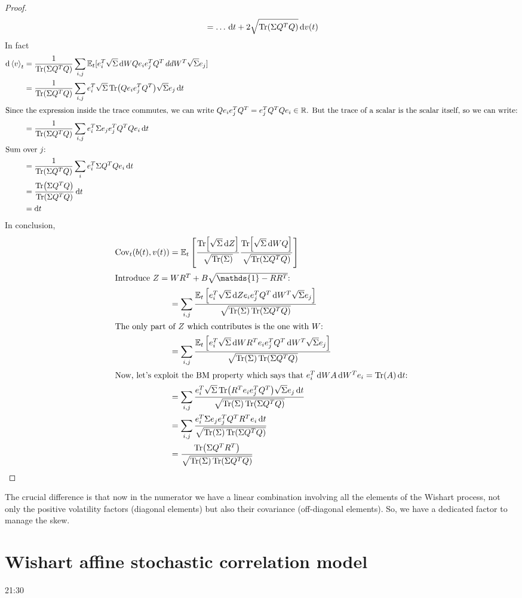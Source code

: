 \begin{proof}
\begin{align*}
        &=
        \dots\,\dd t + 2\sqrt{\Tr(\Sigma Q^TQ)}\,\dd v(t) \\
    \end{align*}
    In fact
    \begin{align*}
        \dd\expval{v}_t &= \frac{1}{\Tr(\Sigma Q^TQ)}\sum_{i,j}\mathbb{E}_t[e^T_i\sqrt{\Sigma}\,\dd WQ e_i e^T_j Q^T\,dd W^T \sqrt{\Sigma} e_j] \\
        &=
        \frac{1}{\Tr(\Sigma Q^TQ)}\sum_{i,j}e^T_i\sqrt{\Sigma}\Tr(Qe_ie_j^TQ^T)\sqrt{\Sigma}e_j\,\dd t \\
        \intertext{Since the expression inside the trace commutes, we can write $Qe_ie_j^TQ^T = e^T_jQ^TQe_i\in\mathbb{R}$. But the trace of a scalar is the scalar itself, so we can write:}
        &=
        \frac{1}{\Tr(\Sigma Q^TQ)}\sum_{i,j}e^T_i\Sigma e_j e_j^TQ^TQe_i\,\dd t \\
        \intertext{Sum over $j$:}
        &=
        \frac{1}{\Tr(\Sigma Q^TQ)} \sum_{i} e^T_i\Sigma Q^TQe_i\,\dd t \\
        &=
        \frac{\Tr(\Sigma Q^TQ)}{\Tr(\Sigma Q^TQ)}\,\dd t \\
        &=
        \dd t
    \end{align*}
    In conclusion,
    \begin{align*}
        \Cov_t(b(t),v(t)) &= \mathbb{E}_t\left[\frac{\Tr[\sqrt{\Sigma}\,\dd Z]}{\sqrt{\Tr(\Sigma)}} \frac{\Tr[\sqrt{\Sigma}\,\dd WQ]}{\sqrt{\Tr(\Sigma Q^TQ)}}\right] \\
        \intertext{Introduce $Z = WR^T + B\sqrt{\mathds{1}-RR^T}$:}
        &=
        \sum_{i,j}\frac{\mathbb{E}_t\left[e^T_i\sqrt{\Sigma}\,\dd Z e_i e^T_j Q^T\,\dd W^T\sqrt{\Sigma}e_j\right]}{\sqrt{\Tr(\Sigma)\Tr(\Sigma Q^TQ)}} \\
        \intertext{The only part of $Z$ which contributes is the one with $W$:}
        &=
        \sum_{i,j}\frac{\mathbb{E}_t\left[e^T_i\sqrt{\Sigma}\,\dd WR^T e_i e^T_j Q^T\,\dd W^T\sqrt{\Sigma}e_j\right]}{\sqrt{\Tr(\Sigma)\Tr(\Sigma Q^TQ)}} \\
        \intertext{Now, let's exploit the BM property which says that $e^T_i\,\dd WA\,\dd W^Te_i = \Tr(A)\,\dd t$:}
        &=
        \sum_{i,j}\frac{e^T_i\sqrt{\Sigma}\Tr(R^Te_ie_j^TQ^T)\sqrt{\Sigma}e_j\,\dd t}{\sqrt{\Tr(\Sigma)\Tr(\Sigma Q^TQ)}} \\
        &=
        \sum_{i,j}\frac{e^T_i\Sigma e_je_j^TQ^TR^Te_i\,\dd t}{\sqrt{\Tr(\Sigma)\Tr(\Sigma Q^TQ)}} \\
        &=
        \frac{\Tr(\Sigma Q^TR^T)}{\sqrt{\Tr(\Sigma)\Tr(\Sigma Q^TQ)}}
    \end{align*}
\end{proof}
The crucial difference is that now in the numerator we have a linear combination involving all the elements of the Wishart process, not only the positive volatility factors (diagonal elements) but also their covariance (off-diagonal elements). So, we have a dedicated factor to manage the skew.

\section{Wishart affine stochastic correlation model}
21:30
